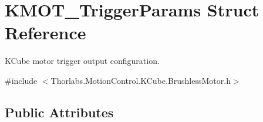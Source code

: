 \hypertarget{struct_k_m_o_t___trigger_params}{}\section{K\+M\+O\+T\+\_\+\+Trigger\+Params Struct Reference}
\label{struct_k_m_o_t___trigger_params}


K\+Cube motor trigger output configuration.  




{\ttfamily \#include $<$Thorlabs.\+Motion\+Control.\+K\+Cube.\+Brushless\+Motor.\+h$>$}

\subsection*{Public Attributes}
